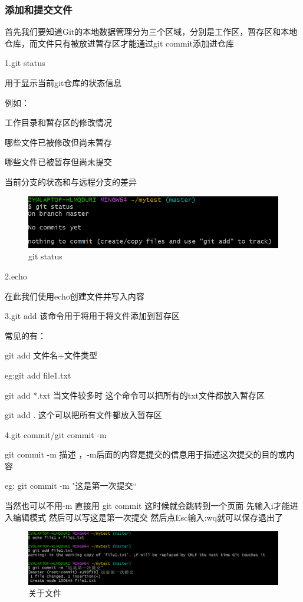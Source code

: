 \documentclass{ctexart}
\begin{document}
	\subsubsection{添加和提交文件}
	首先我们要知道Git的本地数据管理分为三个区域，分别是工作区，暂存区和本地仓库，而文件只有被放进暂存区才能通过git commit添加进仓库
	
	1.git status
	
    用于显示当前git仓库的状态信息
	
	例如：
	
	工作目录和暂存区的修改情况
	
	哪些文件已被修改但尚未暂存
	
	哪些文件已被暂存但尚未提交
	
	当前分支的状态和与远程分支的差异
	\begin{figure}[H]
		\centering
		\includegraphics{git status}
		\caption{git status}
	\end{figure}
	
	2.echo
	
	在此我们使用echo创建文件并写入内容
	
	3.git add 该命令用于将用于将文件添加到暂存区
	
	常见的有：
	
	git add 文件名+文件类型
	
	eg:git add file1.txt
	
	git add *.txt  当文件较多时 这个命令可以把所有的txt文件都放入暂存区
	
	git add . 这个可以把所有文件都放入暂存区
	
	4.git commit/git commit -m
	
	git commit -m 描述 ，-m后面的内容是提交的信息用于描述这次提交的目的或内容
	
	eg: git commit -m "这是第一次提交“
	
	当然也可以不用-m 直接用 git commit 这时候就会跳转到一个页面 先输入i才能进入编辑模式 然后可以写这是第一次提交 然后点Esc输入:wq就可以保存退出了
	\begin{figure}[H]
		\centering
		\includegraphics[scale=0.5]{1}
		\caption{关于文件}
	\end{figure}
	
\end{document}
